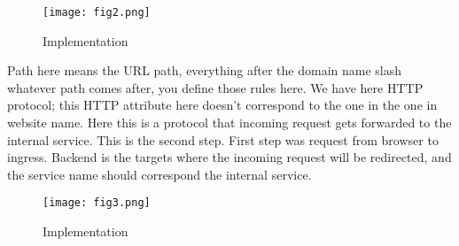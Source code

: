 \documentclass{article}
\begin{document}
\begin{figure}
    \centering
    \texttt{[image: fig2.png]}
    \caption{Implementation}
    \label{fig:my_label}
\end{figure}

Path here means the URL path, everything after the domain name slash whatever path comes after, you define those rules here. 
We have here HTTP protocol; this HTTP attribute here doesn’t correspond to the one in the one in website name. Here this is a protocol that incoming request gets forwarded to the internal service. This is the second step. 
First step was request from browser to ingress.  Backend is the targets where the incoming request will be redirected, and the service name should correspond the internal service.

\begin{figure}
    \centering
    \texttt{[image: fig3.png]}
    \caption{Implementation}
    \label{fig:my_label}
\end{figure}



\end{document}
